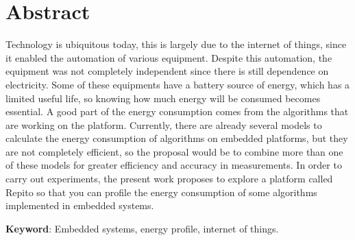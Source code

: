 \chapter*{Abstract}


\noindent Technology is ubiquitous today, this is largely due to the internet
of things, since it enabled the automation of various equipment. Despite this automation, the equipment was not completely independent since there is still dependence on electricity. Some of these equipments have a battery source of energy, which has a limited useful life, so knowing how much energy will be consumed becomes essential. A good part of the energy consumption comes from the algorithms that are working on the platform. Currently, there are already several models to calculate the energy consumption of algorithms on embedded platforms, but they are not completely efficient, so the proposal would be to combine more than one of these models for greater efficiency and accuracy in measurements. In order to carry out experiments, the present work proposes to explore a platform called Repito
so that you can profile the energy consumption of some algorithms
implemented in embedded systems.
 
 \textbf{Keyword}: Embedded systems, energy profile, internet of things.

 